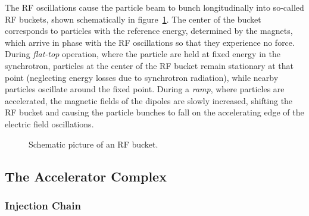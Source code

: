 The RF oscillations cause the particle beam to bunch longitudinally into so-called RF buckets, shown schematically in figure~\ref{fig:RF-bucket}. The center of the bucket corresponds to particles with the reference energy, determined by the magnets, which arrive in phase with the RF oscillations so that they experience no force. During \emph{flat-top} operation, where the particle are held at fixed energy in the synchrotron, particles at the center of the RF bucket remain stationary at that point (neglecting energy losses due to synchrotron radiation), while nearby particles oscillate around the fixed point. During a \emph{ramp}, where particles are accelerated, the magnetic fields of the dipoles are slowly increased, shifting the RF bucket and causing the particle bunches to fall on the accelerating edge of the electric field oscillations. 

\begin{figure}[htbp]
	\centering
	\caption{Schematic picture of an RF bucket.}
	\label{fig:RF-bucket}
\end{figure}

\FloatBarrier

\subsection{The Accelerator Complex}

\subsubsection{Injection Chain}

